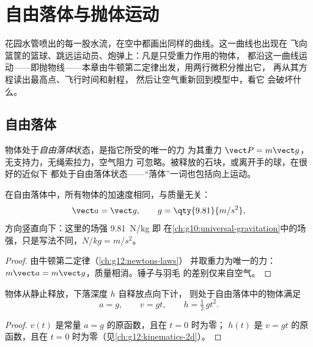 \chapter{自由落体与抛体运动}\label{ch:g12:projectile-motion}

花园水管喷出的每一股水流，在空中都画出同样的曲线。这一曲线也出现在
飞向篮筐的篮球、跳远运动员、炮弹上：凡是只受重力作用的物体，
都沿这一曲线运动——即抛物线——本章由牛顿第二定律出发，用两行微积分推出它，
再从其方程读出最高点、飞行时间和射程，
然后让空气重新回到模型中，看它
会破坏什么。

\section{自由落体}

\begin{definition}[自由落体]\label{def:g12:projectile-motion:freefall}
物体处于\emph{自由落体}状态，是指它所受的唯一的力
为其重力 $\vect P = m\vect g$，无支持力，无绳索拉力，空气阻力
可忽略。被释放的石块，或离开手的球，在很好的近似下
都处于自由落体状态——“落体”一词也包括向上运动。
\end{definition}

\begin{theorem}[伽利略自由落体定律]\label{thm:g12:projectile-motion:galileo}
在自由落体中，所有物体的加速度相同，与质量无关：
\[
\vect a = \vect g, \qquad g = \qty{9.81}{m/s^2},
\]
方向竖直向下：这里的场强 \qty{9.81}{N/kg} 即
在\cref{ch:g10:universal-gravitation}中的场强，只是写法不同，$\unit{N/kg} = \unit{m/s^2}$。
\end{theorem}

\begin{proof}
由牛顿第二定律（\cref{ch:g12:newtons-laws}）
并取重力为唯一的力：$m\vect a = m\vect g$，质量相消。锤子与羽毛
的差别仅来自空气。
\end{proof}

\begin{proposition}[从静止开始的竖直下落]\label{prop:g12:projectile-motion:vertical}
物体从静止释放，下落深度 $h$ 自释放点向下计，
则处于自由落体中的物体满足
\[
a = g, \qquad v = g t, \qquad h = \tfrac12\, g t^2 .
\]
\end{proposition}

\begin{proof}
$v(t)$ 是常量 $a = g$ 的原函数，且在 $t = 0$ 时为零；
$h(t)$ 是 $v = gt$ 的原函数，且在 $t = 0$ 时为零（见\cref{ch:g12:kinematics-2d}）。
\end{proof}


